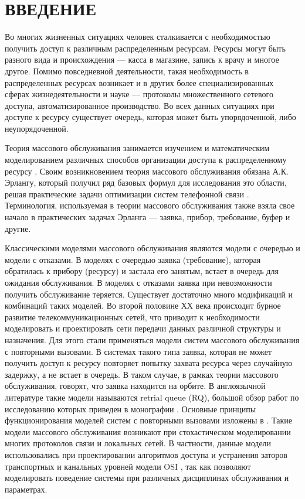 \section*{ВВЕДЕНИЕ}
Во многих жизненных ситуациях человек сталкивается с необходимостью получить доступ к различным распределенным ресурсам. Ресурсы могут быть разного вида и происхождения --- касса в магазине, запись к врачу и многое другое. Помимо повседневной деятельности, такая необходимость в распределенных ресурсах возникает и в других более специализированных сферах жизнедеятельности и науке --- протоколы множественного сетевого доступа, автоматизированное производство. Во всех данных ситуациях при доступе к ресурсу существует очередь, которая может быть упорядоченной, либо неупорядоченной.

Теория массового обслуживания занимается изучением и математическим моделированием различных способов организации доступа к распределенному ресурсу \cite{nazarov2010theory}. Своим возникновением теория массового обслуживания обязана А.К. Эрлангу, который получил ряд базовых формул для исследования это области, решая практические задачи оптимизации систем телефонной связи \cite{erlang1909theory}. Терминология, используемая в теории массового обслуживания также взяла свое начало в практических задачах Эрланга ---  заявка, прибор, требование, буфер и другие.

Классическими моделями массового обслуживания являются модели с очередью и модели с отказами. В моделях с очередью заявка (требование), которая обратилась к прибору (ресурсу) и застала его занятым, встает в очередь для ожидания обслуживания. В моделях с отказами заявка при невозможности получить обслуживание теряется. Существует достаточно много модификаций и комбинаций таких моделей. 
Во второй половине ХХ века происходит бурное развитие телекоммуникационных сетей, что приводит к необходимости моделировать и проектировать сети передачи данных различной структуры и назначения. Для этого стали применяться модели систем массового обслуживания с повторными вызовами. В системах такого типа заявка, которая не может получить доступ к ресурсу повторяет попытку захвата ресурса через случайную задержку, а не встает в очередь. В таком случае, в рамках теории массового обслуживания, говорят, что заявка находится на орбите. В англоязычной литературе такие модели называются retrial queue (RQ), большой обзор работ по исследованию которых приведен в монографии \cite{artalejo2010accessible}. Основные принципы функционирования моделей систем с повторными вызовами изложены в \cite{jesus2008retrial,falin1997retrial}. Такие модели массового обслуживания возникают при стохастическом моделировании многих протоколов связи и локальных сетей. В частности, данные модели использовались при проектировании алгоритмов доступа и устранения заторов транспортных и канальных уровней модели OSI \cite{bjornstad2006traffic,kritzinger1986performance,olypher2010computer}, так как позволяют моделировать поведение системы при различных дисциплинах обслуживания и параметрах.

